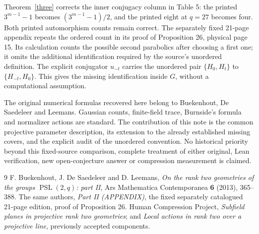\documentclass[11pt]{article}
\newcommand{\PSL}{\operatorname{PSL}}
\begin{document}
Theorem~\ref{three} corrects the inner conjugacy column in Table 5:
the printed $3^{m-1}-1$ becomes $(3^{m-1}-1)/2$, and the printed eight
at $q=27$ becomes four. Both printed automorphism counts remain correct.
The separately fixed 21-page appendix repeats the ordered count in its
proof of Proposition 26, physical page 15. Its calculation counts the
possible second parabolics after choosing a first one; it omits the
additional identification required by the source's unordered definition.
The explicit conjugator $u_{-t}$ carries the unordered pair
$\{H_0,H_t\}$ to $\{H_{-t},H_0\}$. This gives the missing
identification inside $G$, without a computational assumption.

The original numerical formulas recovered here belong to Buekenhout,
De Saedeleer and Leemans. Gaussian counts, finite-field trace, Burnside's
formula and normalizer actions are standard. The contribution of this
note is the common projective parameter description, its extension to
the already established missing covers, and the explicit audit of the
unordered convention. No historical priority beyond this fixed-source
comparison, complete treatment of either original, Lean verification,
new open-conjecture answer or compression measurement is claimed.

\begin{thebibliography}{9}
 F. Buekenhout, J. De Saedeleer and D. Leemans,
\emph{On the rank two geometries of the groups $\PSL(2,q)$: part II},
Ars Mathematica Contemporanea \textbf{6} (2013), 365--388.
 The same authors, \emph{Part II (APPENDIX)},
the fixed separately catalogued 21-page edition, proof of Proposition 26.
 Human Compression Project, \emph{Subfield planes in
projective rank two geometries}; and \emph{Local actions in rank two
over a projective line}, previously accepted components.
\end{thebibliography}
\end{document}
